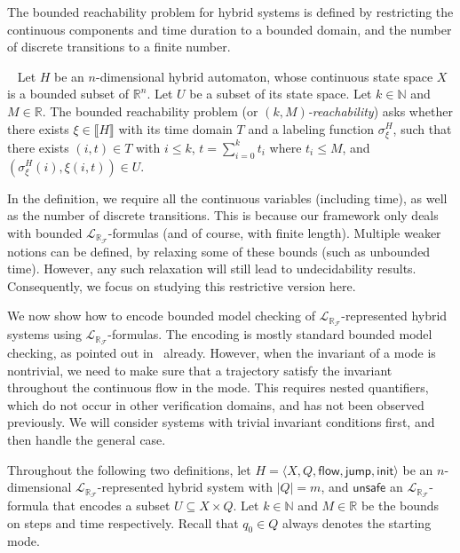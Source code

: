 \documentclass[envcountsect]{llncs}
\newcommand{\flow}{\mathsf{flow}}
\newcommand{\jump}{\mathsf{jump}}
\newcommand{\init}{\mathsf{init}}
\newcommand{\unsafe}{\mathsf{unsafe}}
\newcommand{\lrf}{\mathcal{L}_{\mathbb{R}_{\mathcal{F}}}}
\begin{document}
The bounded reachability problem for hybrid systems is defined by restricting
the continuous components and time duration to a bounded domain, and the number
of discrete transitions to a finite number. 
\begin{definition}~\label{kmbound}
Let $H$ be an $n$-dimensional hybrid automaton, whose continuous state space
$X$ is a bounded subset of $\mathbb{R}^n$. Let $U$ be a subset of its state
space. Let $k\in \mathbb{N}$ and $M \in \mathbb{R}$. The {bounded
reachability problem} (or {\em $(k,M)$-reachability}) asks whether there exists
$\xi\in\llbracket H \rrbracket$ with its time domain $T$ and a labeling function
$\sigma_{\xi}^H$, such that there exists $(i,t)\in T$ with $i\leq k$, $t=
\sum_{i=0}^k t_i$ where $t_i \leq M$, and $(\sigma^H_{\xi}(i), \xi(i,t))\in U.$ 
\end{definition}
\begin{remark}
In the definition, we require all the continuous variables (including
time), as well as the number of discrete transitions. This is because our
framework only deals with bounded $\lrf$-formulas (and of course, with finite
length). Multiple weaker notions can be defined, by relaxing some of these
bounds (such as unbounded time). However, any such relaxation
will still lead to undecidability results. Consequently, we focus on studying
this restrictive version here. 
\end{remark}

We now show how to encode bounded model checking of
$\lrf$-represented hybrid systems using $\lrf$-formulas. The encoding is mostly
standard bounded model checking, as pointed out in~\cite{} already. However,
when the invariant of a mode is nontrivial, we need to make sure that a
trajectory satisfy the invariant throughout the continuous flow in the mode.
This requires nested quantifiers, which do not occur in other verification
domains, and has not been observed previously. We will consider systems with
trivial invariant conditions first, and then handle the general case.

Throughout the following two definitions, let $H = \langle X, Q, \flow,
\jump,\init\rangle$ be an $n$-dimensional $\lrf$-represented hybrid system with
$|Q|=m$, and $\unsafe$ an $\lrf$-formula that encodes a subset $U\subseteq
X\times Q$. Let $k\in \mathbb{N}$ and $M\in \mathbb{R}$ be the bounds on steps
and time respectively. Recall that $q_0\in Q$ always denotes the starting mode. 
\end{document}
